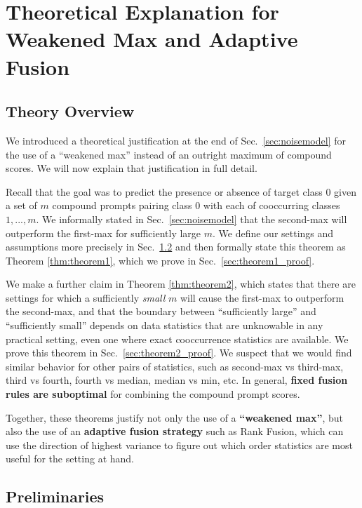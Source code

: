 \section{Theoretical Explanation for Weakened Max and Adaptive Fusion}
\label{sec:theoretical_explanation_for_weakened_max}

\subsection{Theory Overview}

We introduced a theoretical justification at the end of Sec.~\ref{sec:noisemodel} for the use of a ``weakened max'' instead of an outright maximum of compound scores. We will now explain that justification in full detail.

Recall that the goal was to predict the presence or absence of target class $0$ given a set of $m$ compound prompts pairing class $0$ with each of cooccurring classes $1,...,m$. We informally stated in Sec.~\ref{sec:noisemodel} that the second-max will outperform the first-max for sufficiently large $m$. We define our settings and assumptions more precisely in Sec.~\ref{subsec:theory_preliminaries} and then formally state this theorem as Theorem \ref{thm:theorem1}, which we prove in Sec.~\ref{sec:theorem1_proof}.

We make a further claim in Theorem \ref{thm:theorem2}, which states that there are settings for which a sufficiently \emph{small} $m$ will cause the first-max to outperform the second-max, and that the boundary between ``sufficiently large'' and ``sufficiently small'' depends on data statistics that are unknowable in any practical setting, even one where exact cooccurrence statistics are available. We prove this theorem in Sec.~\ref{sec:theorem2_proof}. We suspect that we would find similar behavior for other pairs of statistics, such as second-max vs third-max, third vs fourth, fourth vs median, median vs min, etc. In general, \textbf{fixed fusion rules are suboptimal} for combining the compound prompt scores.

Together, these theorems justify not only the use of a \textbf{``weakened max''}, but also the use of an \textbf{adaptive fusion strategy} such as Rank Fusion, which can use the direction of highest variance to figure out which order statistics are most useful for the setting at hand.

\subsection{Preliminaries}
\label{subsec:theory_preliminaries}

